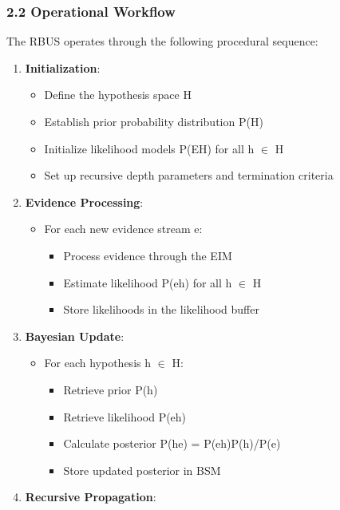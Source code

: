 \documentclass[
]{article}
\providecommand{\tightlist}{%
  \setlength{\itemsep}{0pt}\setlength{\parskip}{0pt}}
\begin{document}
\subsubsection{2.2 Operational Workflow}\label{operational-workflow-1}

The RBUS operates through the following procedural sequence:

\begin{enumerate}
\def\labelenumi{\arabic{enumi}.}
\tightlist
\item
  \textbf{Initialization}:

  \begin{itemize}
  \tightlist
  \item
    Define the hypothesis space H
  \item
    Establish prior probability distribution P(H)
  \item
    Initialize likelihood models P(E\textbar H) for all h \(\in \) H
  \item
    Set up recursive depth parameters and termination criteria
  \end{itemize}
\item
  \textbf{Evidence Processing}:

  \begin{itemize}
  \tightlist
  \item
    For each new evidence stream e:

    \begin{itemize}
    \tightlist
    \item
      Process evidence through the EIM
    \item
      Estimate likelihood P(e\textbar h) for all h \(\in \) H
    \item
      Store likelihoods in the likelihood buffer
    \end{itemize}
  \end{itemize}
\item
  \textbf{Bayesian Update}:

  \begin{itemize}
  \tightlist
  \item
    For each hypothesis h \(\in \) H:

    \begin{itemize}
    \tightlist
    \item
      Retrieve prior P(h)
    \item
      Retrieve likelihood P(e\textbar h)
    \item
      Calculate posterior P(h\textbar e) = P(e\textbar h)P(h)/P(e)
    \item
      Store updated posterior in BSM
    \end{itemize}
  \end{itemize}
\item
  \textbf{Recursive Propagation}:


\end{enumerate}
\end{document}
